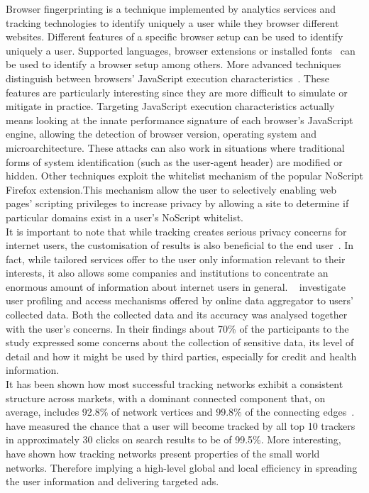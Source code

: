 \documentclass[runningheads,a4paper]{llncs}
\begin{document}
Browser fingerprinting is a technique implemented by analytics services and tracking technologies to identify uniquely a user while they browser different websites. Different features of a specific browser setup can be used to identify uniquely a user. Supported languages, browser extensions or installed fonts~\cite{boda2012user} can be used to identify a browser setup among others. More advanced techniques distinguish between browsers' JavaScript execution characteristics~\cite{mowery2011fingerprinting}. These features are particularly interesting since they are more difficult to simulate or mitigate in practice. Targeting JavaScript execution characteristics actually means looking at the innate performance signature of each browser's JavaScript engine, allowing the detection of browser version, operating system and microarchitecture. These attacks can also work in situations where traditional forms of system identification (such as the user-agent header) are modified or hidden. Other techniques exploit the whitelist mechanism of the popular NoScript Firefox extension.This mechanism allow the user to selectively enabling web pages' scripting privileges to increase privacy by allowing a site to determine if particular domains exist in a user's NoScript whitelist.
\\
It is important to note that while tracking creates serious privacy concerns for internet users, the customisation of results is also beneficial to the end user~\cite{castelluccia2012behavioural}. In fact, while tailored services offer to the user only information relevant to their interests, it also allows some companies and institutions to concentrate an enormous amount of information about internet users in general. ~\cite{rao2015they} investigate user profiling and access mechanisms offered by online data aggregator to users' collected data. Both the collected data and its accuracy was analysed together with the user's concerns. In their findings about 70\% of the participants to the study expressed some concerns about the collection of sensitive data, its level of detail and how it might be used by third parties, especially for credit and health information.
\\
It has been shown how most successful tracking networks exhibit a consistent structure across markets, with a dominant connected component that, on average, includes 92.8\% of network vertices and 99.8\% of the connecting edges~\cite{gomer2013network}. ~\cite{gomer2013network} have measured the chance that a user will become tracked by all top 10 trackers in approximately 30 clicks on search results to be of 99.5\%. More interesting, ~\cite{gomer2013network} have shown how tracking networks present properties of the small world networks. Therefore implying a high-level global and local efficiency in spreading the user information and delivering targeted ads.
\end{document}
